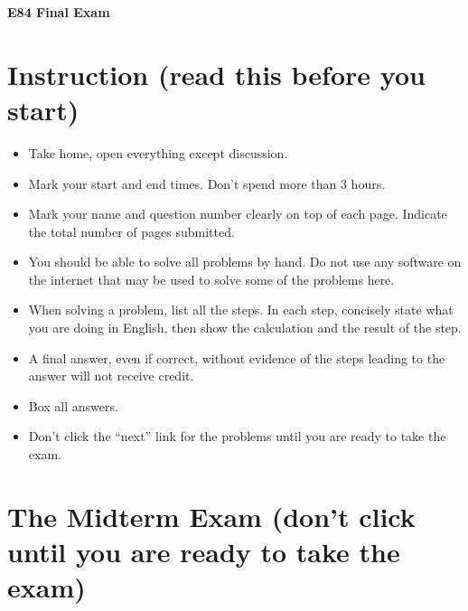 \usepackage{html}

\begin{center}
{\Large \bf E84 Final Exam}
\end{center}

\section*{Instruction (read this before you start)}

\begin{itemize}
\item Take home, open everything except discussion. 
\item Mark your start and end times. Don't spend more than 3 hours.
\item Mark your name and question number clearly on top of each page.
  Indicate the total number of pages submitted.
\item You should be able to solve all problems by hand. Do not use 
  any software on the internet that may be used to solve some of the 
  problems here. 
\item When solving a problem, list all the steps. In each step, concisely
  state what you are doing in English, then show the calculation and the 
  result of the step. 
\item A final answer, even if correct, without evidence of the steps 
  leading to the answer will not receive credit.
\item Box all answers.
\item Don't click the ``next'' link for the problems until you are ready 
  to take the exam.
\end{itemize}

\section*{The Midterm Exam (don't click until you are ready to take the exam)}

